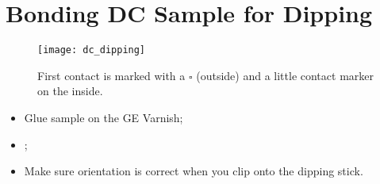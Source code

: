 
\section{Bonding DC Sample for Dipping}
\label{sec:bonding-dc-sample}


\begin{figure}[h]
  \centering \texttt{[image: dc\_dipping]}
  \caption{\small First contact is marked with  a $ \square $ (outside) and
    a little contact marker on the inside.\label{fig:dc_dipping}}
\end{figure}

\begin{itemize}
\item Glue sample on the GE Varnish;
\item {};
\item Make sure orientation is correct when you clip onto the dipping
  stick.
\end{itemize}

\newpage
